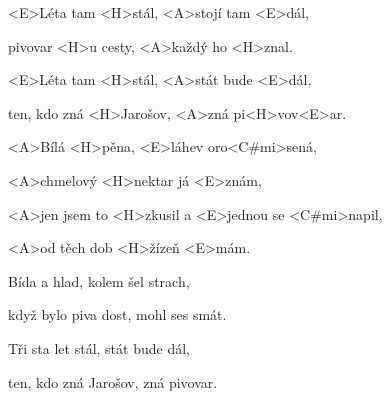

\zs
<E>Léta tam <H>stál, <A>stojí tam <E>dál,

pivovar <H>u cesty, <A>každý ho <H>znal.

<E>Léta tam <H>stál, <A>stát bude <E>dál,

ten, kdo zná <H>Jarošov, <A>zná pi<H>vov<E>ar.
\ks

\zr
<A>Bílá <H>pěna, <E>láhev oro<C#mi>sená,

<A>chmelový <H>nektar já <E>znám,

<A>jen jsem to <H>zkusil a <E>jednou se <C#mi>napil,

<A>od těch dob <H>žízeň <E>mám.
\kr

\zs
Bída a hlad, kolem šel strach,

když bylo piva dost, mohl ses smát.

Tři sta let stál, stát bude dál,

ten, kdo zná Jarošov, zná pivovar.
\ks

\zr \kr


\kp
